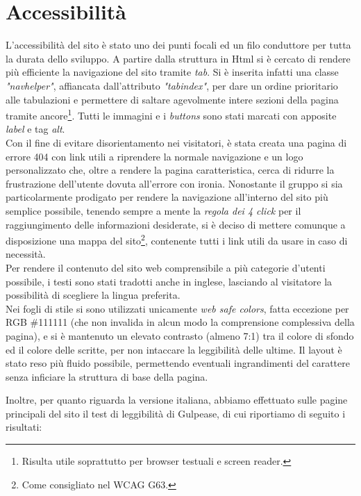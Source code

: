 \section{Accessibilità}
\label{sec:access}
L'accessibilità del sito è stato uno dei punti focali ed un filo conduttore per tutta la durata dello sviluppo. A partire dalla struttura in Html si è cercato di rendere più efficiente la navigazione del sito tramite \emph{tab}. Si è inserita infatti una classe \emph{"navhelper"}, affiancata dall'attributo \emph{"tabindex"}, per dare un ordine prioritario alle tabulazioni e permettere di saltare agevolmente intere sezioni della pagina tramite ancore\footnote{Risulta utile soprattutto per browser testuali e screen reader.}. 
Tutti le immagini e i \emph{buttons} sono stati marcati con apposite \emph{label} e tag \emph{alt}.\\
Con il fine di evitare disorientamento nei visitatori, è stata creata una pagina di errore 404 con link utili a riprendere la normale navigazione e un logo personalizzato che, oltre a rendere la pagina caratteristica, cerca di ridurre la frustrazione dell'utente dovuta all'errore con ironia. Nonostante il gruppo si sia particolarmente prodigato per rendere la navigazione all'interno del sito più semplice possibile, tenendo sempre a mente la \emph{regola dei 4 click} per il raggiungimento delle informazioni desiderate, si è deciso di mettere comunque a disposizione una mappa del sito\footnote{Come consigliato nel WCAG G63.}, contenente tutti i link utili da usare in caso di necessità.\\ 
Per rendere il contenuto del sito web comprensibile a più categorie d'utenti possibile, i testi sono stati tradotti anche in inglese, lasciando al visitatore la possibilità di scegliere la lingua preferita.\\
Nei fogli di stile si sono utilizzati unicamente \emph{web safe colors}, fatta eccezione per RGB \#111111 (che non invalida in alcun modo la comprensione complessiva della pagina), e si è mantenuto un elevato contrasto (almeno 7:1) tra il colore di sfondo ed il colore delle scritte, per non intaccare la leggibilità delle ultime. Il layout è stato reso più fluido possibile, permettendo eventuali ingrandimenti del carattere senza inficiare la struttura di base della pagina. 

\pagebreak
Inoltre, per quanto riguarda la versione italiana, abbiamo effettuato sulle pagine principali del sito il test di leggibilità di Gulpease, di cui riportiamo di seguito i risultati: \\

